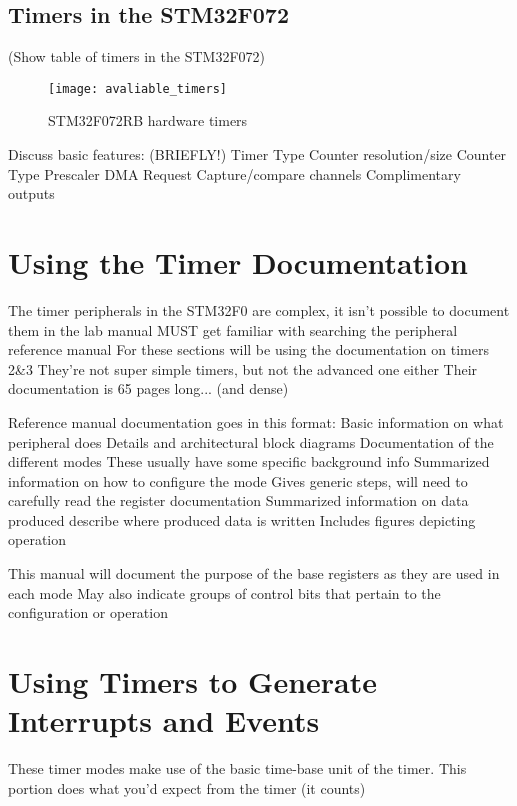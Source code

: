 \documentclass[11pt,fleqn]{book} %
\begin{document}
    \subsection{Timers in the STM32F072}
        (Show table of timers in the STM32F072)
        \begin{figure}[]
            \centering\texttt{[image: avaliable\_timers]}
            \caption{STM32F072RB hardware timers}
            \label{avaliable_timers}
        \end{figure}
        
        Discuss basic features: (BRIEFLY!)
            Timer Type
            Counter resolution/size
            Counter Type
            Prescaler
            DMA Request
            Capture/compare channels
            Complimentary outputs
    

\section{Using the Timer Documentation}
    The timer peripherals in the STM32F0 are complex, it isn't possible to document them in the lab manual
    MUST get familiar with searching the peripheral reference manual
    For these sections will be using the documentation on timers 2\&3 
        They're not super simple timers, but not the advanced one either
        Their documentation is 65 pages long... (and dense)
    
    Reference manual documentation goes in this format:
        Basic information on what peripheral does
        Details and architectural block diagrams
        Documentation of the different modes
        These usually have some specific background info
        Summarized information on how to configure the mode
            Gives generic steps, will need to carefully read the register documentation
        Summarized information on data produced 
            describe where produced data is written
            Includes figures depicting operation
    
    This manual will document the purpose of the base registers as they are used in each mode
        May also indicate groups of control bits that pertain to the configuration or operation 	

\section{Using Timers to Generate Interrupts and Events}
    These timer modes make use of the basic time-base unit of the timer. 
    This portion does what you'd expect from the timer (it counts)
    
\end{document}
